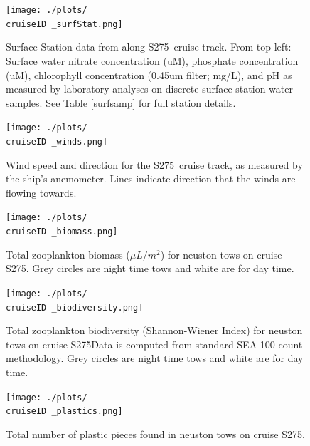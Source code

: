 \documentclass[letterpaper,11pt]{article}
\newcommand{\cruiseID}{S275}
\begin{document}
\begin{figure}[t]
\centering
\texttt{[image: ./plots/\\cruiseID \_surfStat.png]}
\caption[Surface Station data from along \cruiseID\ cruise track]{Surface Station data from along \cruiseID\ cruise track. From top left: Surface water nitrate concentration (uM), phosphate concentration (uM), chlorophyll concentration (0.45um filter; mg/L), and pH as measured by laboratory analyses on discrete surface station water samples. See Table \ref{surfsamp} for full station details.}
\label{surfstat}
\end{figure}

\begin{figure}[t]
\centering
\texttt{[image: ./plots/\\cruiseID \_winds.png]}
\caption[Wind vector summary]{Wind speed and direction for the \cruiseID\ cruise track, as measured by the ship’s anemometer. Lines indicate direction that the winds are flowing towards.}
\label{winds}
\end{figure}

\begin{figure}[t]
\centering
\texttt{[image: ./plots/\\cruiseID \_biomass.png]}
\caption[Zooplankton biomass]{Total zooplankton biomass ($\mu L/m^2$) for neuston tows on cruise \cruiseID. Grey circles are night time tows and white are for day time.}
\label{biomass}
\end{figure}

\begin{figure}[t]
\centering
\texttt{[image: ./plots/\\cruiseID \_biodiversity.png]}
\caption[Zooplankton Biodiversity]{Total zooplankton biodiversity (Shannon-Wiener Index) for neuston tows on cruise \cruiseID\. Data is computed from standard SEA 100 count methodology. Grey circles are night time tows and white are for day time.}
\label{biodiversity}
\end{figure}

\begin{figure}[t]
\centering
\texttt{[image: ./plots/\\cruiseID \_plastics.png]}
\caption[Plastic Distribution]{Total number of plastic pieces found in neuston tows on cruise \cruiseID.}
\label{plastics}
\end{figure}
\end{document}
